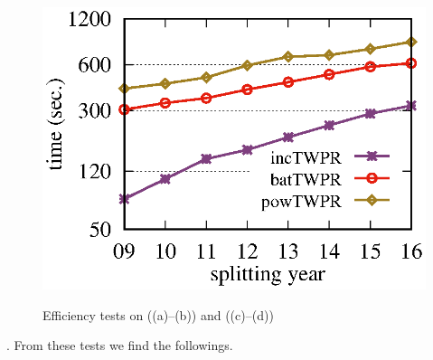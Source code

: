 \begin{figure}[tb!]
\begin{center}
{\includegraphics[scale=\graphscale]{./exp/MAG_time_twpr.eps}}
\hspace{-.5ex}
\end{center}
\vspace{-3.5ex}
\caption{\small Efficiency tests on \aminer ((a)--(b)) and  \magdata ((c)--(d))}
\label{fig-time}
\vspace{-2.5ex}
\end{figure}

.
From these tests we find the followings.


